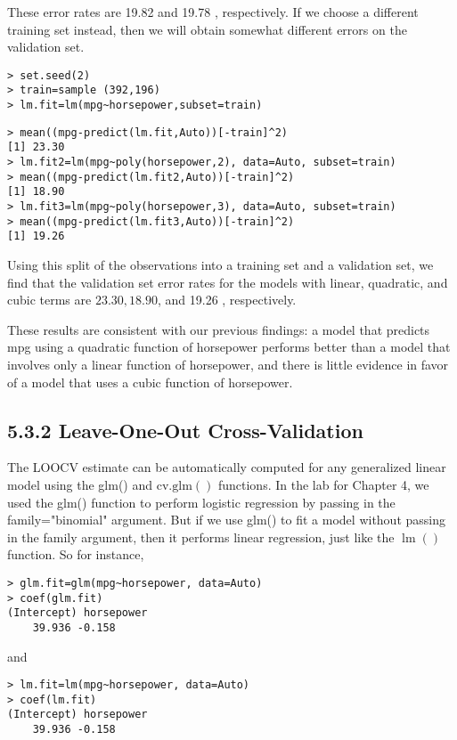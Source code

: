 \documentclass[10pt]{article}
\begin{document}
These error rates are 19.82 and 19.78 , respectively. If we choose a different training set instead, then we will obtain somewhat different errors on the validation set.

\begin{verbatim}
> set.seed(2)
> train=sample (392,196)
> lm.fit=lm(mpg~horsepower,subset=train)
\end{verbatim}

\begin{verbatim}
> mean((mpg-predict(lm.fit,Auto))[-train]^2)
[1] 23.30
> lm.fit2=lm(mpg~poly(horsepower,2), data=Auto, subset=train)
> mean((mpg-predict(lm.fit2,Auto))[-train]^2)
[1] 18.90
> lm.fit3=lm(mpg~poly(horsepower,3), data=Auto, subset=train)
> mean((mpg-predict(lm.fit3,Auto))[-train]^2)
[1] 19.26
\end{verbatim}

Using this split of the observations into a training set and a validation set, we find that the validation set error rates for the models with linear, quadratic, and cubic terms are $23.30,18.90$, and 19.26 , respectively.

These results are consistent with our previous findings: a model that predicts mpg using a quadratic function of horsepower performs better than a model that involves only a linear function of horsepower, and there is little evidence in favor of a model that uses a cubic function of horsepower.

\subsection*{5.3.2 Leave-One-Out Cross-Validation}
The LOOCV estimate can be automatically computed for any generalized linear model using the glm() and $\mathrm{cv} . \mathrm{glm}()$ functions. In the lab for Chapter 4, we used the glm() function to perform logistic regression by passing in the family="binomial" argument. But if we use glm() to fit a model without passing in the family argument, then it performs linear regression, just like the $\operatorname{lm}()$ function. So for instance,

\begin{verbatim}
> glm.fit=glm(mpg~horsepower, data=Auto)
> coef(glm.fit)
(Intercept) horsepower
    39.936 -0.158
\end{verbatim}

and

\begin{verbatim}
> lm.fit=lm(mpg~horsepower, data=Auto)
> coef(lm.fit)
(Intercept) horsepower
    39.936 -0.158
\end{verbatim}
\end{document}
